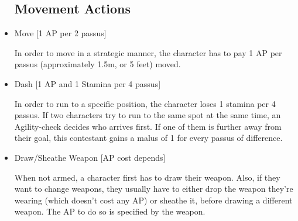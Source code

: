 \begin{itemize}
\subsection{Movement Actions}

\item Move [1 AP per 2 passus]

In order to move in a strategic manner, the character has to pay 1 AP per passus (approximately 1.5m, or 5 feet) moved. 



\item Dash [1 AP and 1 Stamina per 4 passus]

In order to run to a specific position, the character loses 1 stamina per 4 passus. If two characters try to run to the same spot at the same time, an Agility-check decides who arrives first. If one of them is further away from their goal, this contestant gains a malus of 1 for every passus of difference.


\item Draw/Sheathe Weapon  [AP cost depends]

When not armed, a character first has to draw their weapon. Also, if they want to change weapons, they usually have to either drop the weapon they're wearing (which doesn't cost any AP) or sheathe it, before drawing a different weapon. The AP to do so is specified by the weapon.


\end{itemize}